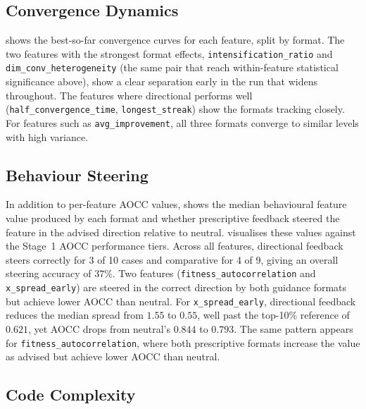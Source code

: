 \subsection{Convergence Dynamics}
\label{sec:results-convergence}

 shows the best-so-far convergence curves for each feature, split by format. The two features with the strongest format effects, \texttt{intensification\_ratio} and \texttt{dim\_conv\_heterogeneity} (the same pair that reach within-feature statistical significance above), show a clear separation early in the run that widens throughout. The features where directional performs well (\texttt{half\_convergence\_time}, \texttt{longest\_streak}) show the formats tracking closely. For features such as \texttt{avg\_improvement}, all three formats converge to similar levels with high variance.

\subsection{Behaviour Steering}
\label{sec:results-decoupling}

In addition to per-feature AOCC values,  shows the median behavioural feature value produced by each format and whether prescriptive feedback steered the feature in the advised direction relative to neutral.  visualises these values against the Stage~1 AOCC performance tiers. Across all features, directional feedback steers correctly for 3 of 10 cases and comparative for 4 of 9, giving an overall steering accuracy of $37\%$. Two features (\texttt{fitness\_autocorrelation} and \texttt{x\_spread\_early}) are steered in the correct direction by both guidance formats but achieve lower AOCC than neutral. For \texttt{x\_spread\_early}, directional feedback reduces the median spread from $1.55$ to $0.55$, well past the top-10\% reference of $0.621$, yet AOCC drops from neutral's $0.844$ to $0.793$. The same pattern appears for \texttt{fitness\_autocorrelation}, where both prescriptive formats increase the value as advised but achieve lower AOCC than neutral.

\subsection{Code Complexity}
\label{sec:results-ast}

